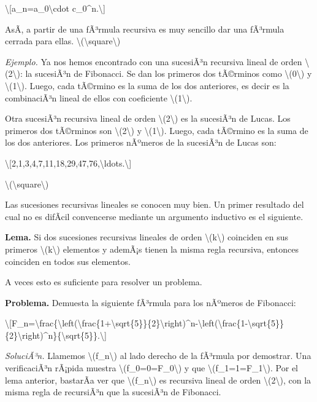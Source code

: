 \textbackslash{[}a\_n=a\_0\textbackslash cdot
c\_0\^{}n.\textbackslash{]}

AsÃ­, a partir de una fÃ³rmula recursiva es muy sencillo dar una fÃ³rmula
cerrada para ellas.
{{\textbackslash(\textbackslash square\textbackslash)}}

\emph{Ejemplo.} Ya nos hemos encontrado con una sucesiÃ³n recursiva
lineal de orden {\textbackslash(2\textbackslash)}: la sucesiÃ³n de
Fibonacci. Se dan los primeros dos tÃ©rminos como
{\textbackslash(0\textbackslash)} y {\textbackslash(1\textbackslash)}.
Luego, cada tÃ©rmino es la suma de los dos anteriores, es decir es la
combinaciÃ³n lineal de ellos con coeficiente
{\textbackslash(1\textbackslash)}.

Otra sucesiÃ³n recursiva lineal de orden
{\textbackslash(2\textbackslash)} es la sucesiÃ³n de Lucas. Los primeros
dos tÃ©rminos son {\textbackslash(2\textbackslash)} y
{\textbackslash(1\textbackslash)}. Luego, cada tÃ©rmino es la suma de
los dos anteriores. Los primeros nÃºmeros de la sucesiÃ³n de Lucas son:

\textbackslash{[}2,1,3,4,7,11,18,29,47,76,\textbackslash ldots.\textbackslash{]}

{{\textbackslash(\textbackslash square\textbackslash)}}

Las sucesiones recursivas lineales se conocen muy bien. Un primer
resultado del cual no es difÃ­cil convencerse mediante un argumento
inductivo es el siguiente.

\textbf{Lema.} Si dos sucesiones recursivas lineales de orden
{\textbackslash(k\textbackslash)} coinciden en sus primeros
{\textbackslash(k\textbackslash)} elementos y ademÃ¡s tienen la misma
regla recursiva, entonces coinciden en todos sus elementos.

A veces esto es suficiente para resolver un problema.

\textbf{Problema.} Demuesta la siguiente fÃ³rmula para los nÃºmeros de
Fibonacci:

\textbackslash{[}F\_n=\textbackslash frac\{\textbackslash left(\textbackslash frac\{1+\textbackslash sqrt\{5\}\}\{2\}\textbackslash right)\^{}n-\textbackslash left(\textbackslash frac\{1-\textbackslash sqrt\{5\}\}\{2\}\textbackslash right)\^{}n\}\{\textbackslash sqrt\{5\}\}.\textbackslash{]}

\emph{SoluciÃ³n.} Llamemos {\textbackslash(f\_n\textbackslash)} al lado
derecho de la fÃ³rmula por demostrar. Una verificaciÃ³n rÃ¡pida muestra
{\textbackslash(f\_0=0=F\_0\textbackslash)} y que
{\textbackslash(f\_1=1=F\_1\textbackslash)}. Por el lema anterior,
bastarÃ­a ver que {\textbackslash(f\_n\textbackslash)} es recursiva
lineal de orden {\textbackslash(2\textbackslash)}, con la misma regla de
recursiÃ³n que la sucesiÃ³n de Fibonacci.

